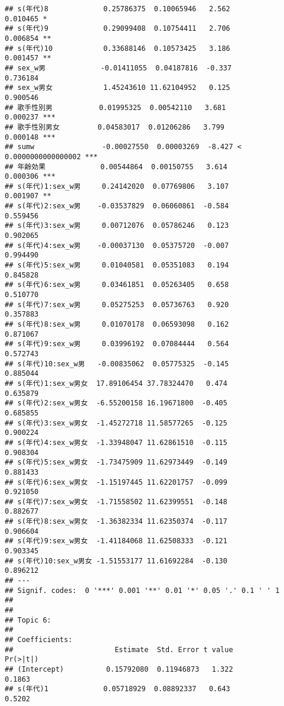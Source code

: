 \documentclass[
]{article}
\begin{document}
\begin{verbatim}
## s(年代)8             0.25786375  0.10065946   2.562             0.010465 *  
## s(年代)9             0.29099408  0.10754411   2.706             0.006854 ** 
## s(年代)10            0.33688146  0.10573425   3.186             0.001457 ** 
## sex_w男             -0.01411055  0.04187816  -0.337             0.736184    
## sex_w男女            1.45243610 11.62104952   0.125             0.900546    
## 歌手性別男           0.01995325  0.00542110   3.681             0.000237 ***
## 歌手性別男女         0.04583017  0.01206286   3.799             0.000148 ***
## sumw                -0.00027550  0.00003269  -8.427 < 0.0000000000000002 ***
## 年齢効果             0.00544864  0.00150755   3.614             0.000306 ***
## s(年代)1:sex_w男     0.24142020  0.07769806   3.107             0.001907 ** 
## s(年代)2:sex_w男    -0.03537829  0.06060861  -0.584             0.559456    
## s(年代)3:sex_w男     0.00712076  0.05786246   0.123             0.902065    
## s(年代)4:sex_w男    -0.00037130  0.05375720  -0.007             0.994490    
## s(年代)5:sex_w男     0.01040581  0.05351083   0.194             0.845828    
## s(年代)6:sex_w男     0.03461851  0.05263405   0.658             0.510770    
## s(年代)7:sex_w男     0.05275253  0.05736763   0.920             0.357883    
## s(年代)8:sex_w男     0.01070178  0.06593098   0.162             0.871067    
## s(年代)9:sex_w男     0.03996192  0.07084444   0.564             0.572743    
## s(年代)10:sex_w男   -0.00835062  0.05775325  -0.145             0.885044    
## s(年代)1:sex_w男女  17.89106454 37.78324470   0.474             0.635879    
## s(年代)2:sex_w男女  -6.55200158 16.19671800  -0.405             0.685855    
## s(年代)3:sex_w男女  -1.45272718 11.58577265  -0.125             0.900224    
## s(年代)4:sex_w男女  -1.33948047 11.62861510  -0.115             0.908304    
## s(年代)5:sex_w男女  -1.73475909 11.62973449  -0.149             0.881433    
## s(年代)6:sex_w男女  -1.15197445 11.62201757  -0.099             0.921050    
## s(年代)7:sex_w男女  -1.71558502 11.62399551  -0.148             0.882677    
## s(年代)8:sex_w男女  -1.36382334 11.62350374  -0.117             0.906604    
## s(年代)9:sex_w男女  -1.41184068 11.62508333  -0.121             0.903345    
## s(年代)10:sex_w男女 -1.51553177 11.61692284  -0.130             0.896212    
## ---
## Signif. codes:  0 '***' 0.001 '**' 0.01 '*' 0.05 '.' 0.1 ' ' 1
## 
## 
## Topic 6:
## 
## Coefficients:
##                        Estimate  Std. Error t value            Pr(>|t|)    
## (Intercept)          0.15792080  0.11946873   1.322              0.1863    
## s(年代)1             0.05718929  0.08892337   0.643              0.5202    

\end{verbatim}
\end{document}
